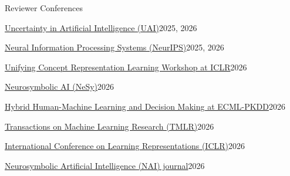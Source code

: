 \documentclass[11pt, a4paper]{awesome-cv}
\begin{document}
\begin{cventries}
  \cventry
    {Reviewer} %
    {Conferences}
    {} %
    {} %
    {
        \begin{cvitems}
            \item {\href{https://www.auai.org/}{Uncertainty in Artificial Intelligence (UAI)}}\hfill2025, 2026
            \item {\href{https://neurips.cc/}{Neural Information Processing Systems (NeurIPS)}}\hfill2025, 2026
            \item {\href{https://ucrl-iclr26.github.io/}{Unifying Concept Representation Learning Workshop at ICLR}}\hfill2026
            \item {\href{https://nesy-ai.org/conferences/nesy-2026}{Neurosymbolic AI (NeSy)}}\hfill2026
            \item {\href{https://sml.disi.unitn.it/hldm26.html}{Hybrid Human-Machine Learning and Decision Making at ECML-PKDD}}\hfill2026
            \item {\href{https://jmlr.org/tmlr/}{Transactions on Machine Learning Research (TMLR)}}\hfill2026
            \item {\href{https://iclr.cc/}{International Conference on Learning Representations (ICLR)}}\hfill2026
            \item {\href{https://neurosymbolic-ai-journal.com/}{Neurosymbolic Artificial Intelligence (NAI) journal}}\hfill2026
      \end{cvitems}
    }
\end{cventries}
\end{document}
